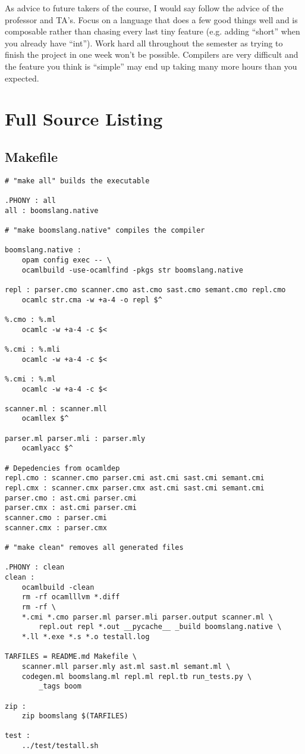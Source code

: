 \documentclass{article}
\begin{document}
As advice to future takers of the course, I would say follow the advice of the professor and TA's. Focus on a language that does a few good things well and is composable rather than chasing every last tiny feature (e.g. adding ``short'' when you already have ``int''). Work hard all throughout the semester as trying to finish the project in one week won't be possible. Compilers are very difficult and the feature you think is ``simple'' may end up taking many more hours than you expected.

\section{Full Source Listing}
\subsection{Makefile}
\begin{verbatim}
# "make all" builds the executable

.PHONY : all
all : boomslang.native

# "make boomslang.native" compiles the compiler

boomslang.native :
	opam config exec -- \
	ocamlbuild -use-ocamlfind -pkgs str boomslang.native

repl : parser.cmo scanner.cmo ast.cmo sast.cmo semant.cmo repl.cmo
	ocamlc str.cma -w +a-4 -o repl $^

%.cmo : %.ml
	ocamlc -w +a-4 -c $<

%.cmi : %.mli
	ocamlc -w +a-4 -c $<

%.cmi : %.ml
	ocamlc -w +a-4 -c $<

scanner.ml : scanner.mll
	ocamllex $^

parser.ml parser.mli : parser.mly
	ocamlyacc $^

# Depedencies from ocamldep
repl.cmo : scanner.cmo parser.cmi ast.cmi sast.cmi semant.cmi
repl.cmx : scanner.cmx parser.cmx ast.cmi sast.cmi semant.cmi
parser.cmo : ast.cmi parser.cmi
parser.cmx : ast.cmi parser.cmi
scanner.cmo : parser.cmi
scanner.cmx : parser.cmx

# "make clean" removes all generated files

.PHONY : clean
clean :
	ocamlbuild -clean
	rm -rf ocamlllvm *.diff
	rm -rf \
	*.cmi *.cmo parser.ml parser.mli parser.output scanner.ml \
        repl.out repl *.out __pycache__ _build boomslang.native \
	*.ll *.exe *.s *.o testall.log

TARFILES = README.md Makefile \
	scanner.mll parser.mly ast.ml sast.ml semant.ml \
	codegen.ml boomslang.ml repl.ml repl.tb run_tests.py \
        _tags boom

zip :
	zip boomslang $(TARFILES)

test :
	../test/testall.sh
\end{verbatim}
\end{document}

